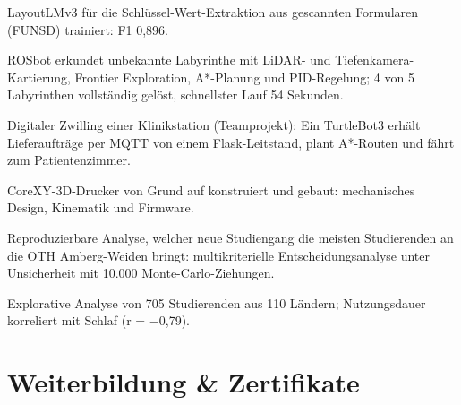 \documentclass[a4paper,10pt]{article}
\begin{document}
  \cvpointsstart
    \item LayoutLMv3 für die Schlüssel-Wert-Extraktion aus gescannten Formularen (FUNSD) trainiert: F1 0,896.
  \cvpointsend


  \cvpointsstart
    \item ROSbot erkundet unbekannte Labyrinthe mit LiDAR- und Tiefenkamera-Kartierung, Frontier Exploration,
          A*-Planung und PID-Regelung; 4 von 5 Labyrinthen vollständig gelöst, schnellster Lauf 54 Sekunden.
  \cvpointsend

  \cvpointsstart
    \item Digitaler Zwilling einer Klinikstation (Teamprojekt): Ein TurtleBot3 erhält Lieferaufträge per MQTT von
          einem Flask-Leitstand, plant A*-Routen und fährt zum Patientenzimmer.
  \cvpointsend

  \cvpointsstart
    \item CoreXY-3D-Drucker von Grund auf konstruiert und gebaut: mechanisches Design, Kinematik und Firmware.
  \cvpointsend


  \cvpointsstart
    \item Reproduzierbare Analyse, welcher neue Studiengang die meisten Studierenden an die OTH Amberg-Weiden bringt:
          multikriterielle Entscheidungsanalyse unter Unsicherheit mit 10.000 Monte-Carlo-Ziehungen.
  \cvpointsend

  \cvpointsstart
    \item Explorative Analyse von 705 Studierenden aus 110 Ländern; Nutzungsdauer korreliert mit Schlaf (r = $-$0,79).
  \cvpointsend

\cvlistend

\section{Weiterbildung \& Zertifikate}
\cvliststart
\cvlistend
\end{document}
